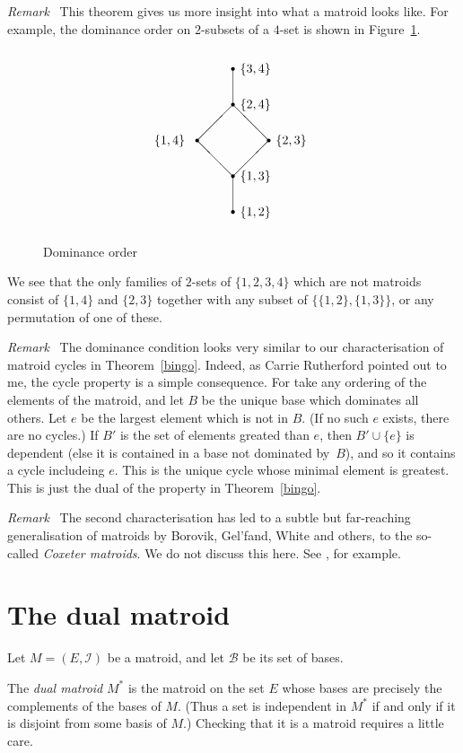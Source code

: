 \documentclass[12pt]{article}
\newcommand{\head}[1]{\medbreak\noindent\textit{#1}\ }
\begin{document}
\head{Remark} This theorem gives us more insight into what a matroid
looks like. For example, the dominance order on $2$-subsets of
a $4$-set is shown in Figure~\ref{f1}.
\begin{figure}[htb]
\[
\setlength{\unitlength}{1mm}
\begin{picture}(40,50)
\multiput(20,5)(0,10){2}{\circle*{1}}
\multiput(10,25)(20,0){2}{\circle*{1}}
\multiput(20,35)(0,10){2}{\circle*{1}}
\multiput(20,5)(0,30){2}{\line(0,1){10}}
\multiput(20,15)(10,10){2}{\line(-1,1){10}}
\multiput(20,15)(-10,10){2}{\line(1,1){10}}
\put(22,4){$\{1,2\}$}
\put(22,14){$\{1,3\}$}
\put(32,24){$\{2,3\}$}
\put(-2,24){$\{1,4\}$}
\put(22,34){$\{2,4\}$}
\put(22,44){$\{3,4\}$}
\end{picture}
\]
\caption{Dominance order}
\label{f1}
\end{figure}
We see that the only families of $2$-sets of $\{1,2,3,4\}$ which
are not matroids consist of $\{1,4\}$ and $\{2,3\}$ together with
any subset of $\{\{1,2\},\{1,3\}\}$, or any permutation of one
of these.

\head{Remark} The dominance condition looks very similar to our
characterisation of matroid cycles in Theorem~\ref{bingo}. Indeed, as
Carrie Rutherford pointed out to me, the cycle property is a simple
consequence. For take any ordering of the elements of the matroid, and
let $B$ be the unique base which dominates all others. Let $e$ be the
largest element which is not in $B$. (If no  such $e$ exists, there are
no cycles.) If $B'$ is the set of elements greated than $e$, then
$B'\cup\{e\}$ is dependent (else it is contained in a base not dominated
by~$B$), and so it contains a cycle includeing $e$. This is the unique
cycle whose minimal element is greatest. This is just the dual of the
property in Theorem~\ref{bingo}.

\head{Remark} The second characterisation has led to a subtle but
far-reaching generalisation of matroids by Borovik, Gel'fand,
White and others, to the so-called \emph{Coxeter matroids}.
We do not discuss this here. See \cite{bg}, for example.

\section{The dual matroid}

Let $M=(E,\mathcal{I})$ be a matroid, and let $\mathcal{B}$ be its
set of bases.

The \emph{dual matroid} $M^*$ is the matroid on the set $E$ whose
bases are precisely the complements of the bases of $M$. (Thus
a set is independent in $M^*$ if and only if it is disjoint from
some basis of $M$.) Checking that it is a matroid requires a
little care.
\end{document}
